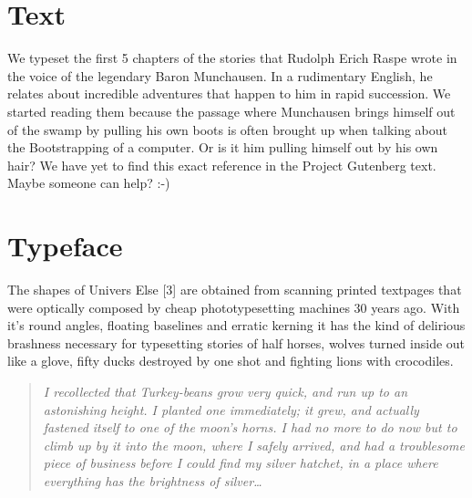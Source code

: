\documentclass{article}
\begin{document}
\section*{Text}
We typeset the first 5 chapters of the stories that Rudolph Erich Raspe wrote
in the voice of the legendary Baron Munchausen. In a rudimentary English, he
relates about incredible adventures that happen to him in rapid succession. We
started reading them because the passage where Munchausen brings himself out
of the swamp by pulling his own boots is often brought up when talking about
the Bootstrapping of a computer. Or is it him pulling himself out by his own
hair? We have yet to find this exact reference in the Project Gutenberg text.
Maybe someone can help? :-)

\section*{Typeface}
The shapes of Univers Else [3] are obtained from scanning printed textpages
that were optically composed by cheap phototypesetting machines 30 years ago.
With it's round angles, floating baselines and erratic kerning it has the kind
of delirious brashness necessary for typesetting stories of half horses,
wolves turned inside out like a glove, fifty ducks destroyed by one shot and
fighting lions with crocodiles.

\begin{quote}
\textit{I recollected that Turkey-beans grow very quick, and run up to an
astonishing height. I planted one immediately; it grew, and actually fastened
itself to one of the moon's horns. I had no more to do now but to climb up by
it into the moon, where I safely arrived, and had a troublesome piece of
business before I could find my silver hatchet, in a place where everything
has the brightness of silver\dots}
\end{quote}
\end{document}

